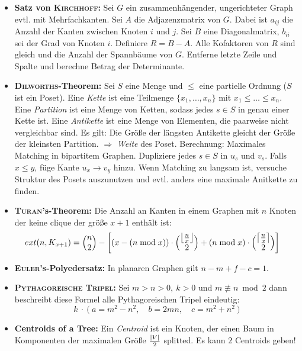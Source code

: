 \begin{itemize}
	\item \textbf{Satz von \textsc{Kirchhoff}:}
	Sei $G$ ein zusammenhängender, ungerichteter Graph evtl. mit Mehrfachkanten.
	Sei $A$ die Adjazenzmatrix von $G$.
	Dabei ist $a_{ij}$ die Anzahl der Kanten zwischen Knoten $i$ und $j$.
	Sei $B$ eine Diagonalmatrix, $b_{ii}$ sei der Grad von Knoten $i$.
	Definiere $R = B - A$.
	Alle Kofaktoren von $R$ sind gleich und die Anzahl der Spannbäume von $G$.
	\newline
	Entferne letzte Zeile und Spalte und berechne Betrag der Determinante.

	\item \textbf{\textsc{Dilworths}-Theorem:}
	Sei $S$ eine Menge und $\leq$ eine partielle Ordnung ($S$ ist ein Poset).
	Eine \emph{Kette} ist eine Teilmenge $\{x_1,\ldots,x_n\}$ mit $x_1 \leq \ldots \leq x_n$.
	Eine \emph{Partition} ist eine Menge von Ketten, sodass jedes $s \in S$ in genau einer Kette ist.
	Eine \emph{Antikette} ist eine Menge von Elementen, die paarweise nicht vergleichbar sind.
	\newline
	Es gilt: Die Größe der längsten Antikette gleicht der Größe der kleinsten Partition.
	$\Rightarrow$ \emph{Weite} des Poset.
	\newline
	Berechnung: Maximales Matching in bipartitem Graphen.
	Dupliziere jedes $s \in S$ in $u_s$ und $v_s$.
	Falls $x \leq y$, füge Kante $u_x \to v_y$ hinzu.
	Wenn Matching zu langsam ist, versuche Struktur des Posets auszunutzen und evtl. anders eine maximale Anitkette zu finden. 
	
	\item \textbf{\textsc{Turan}'s-Theorem:}
	Die Anzahl an Kanten in einem Graphen mit $n$ Knoten der keine clique der größe $x+1$ enthält ist:
	\begin{align*}
	ext(n, K_{x+1}) &= \Bigl( \begin{matrix} n \\ 2 \end{matrix} \Bigr) - \left[\left(x - (n \bmod x)\right) \cdot \Bigl( \begin{matrix} \left\lfloor\frac{n}{x}\right\rfloor \\ 2 \end{matrix} \Bigr) + \left(n\bmod x\right)  \cdot \Bigl( \begin{matrix} \left\lceil\frac{n}{x}\right\rceil \\ 2 \end{matrix} \Bigr)\right]
	\end{align*}
	
	\item \textbf{\textsc{Euler}'s-Polyedersatz:}
	In planaren Graphen gilt $n-m+f-c=1$.
	
	\item \textbf{\textsc{Pythagoreische Tripel}:}
	Sei $m>n>0,~k>0$ und $m\not\equiv n \bmod 2$ dann beschreibt diese Formel alle Pythagoreischen Tripel eindeutig:
	\[k~\cdot~\Big(~a=m^2-n^2,\quad b=2mn,\quad c=m^2+n^2~\Big)\]
	
	\item \textbf{Centroids of a Tree:}
	Ein \emph{Centroid} ist ein Knoten, der einen Baum in Komponenten der maximalen Größe $\frac{\left|V\right|}{2}$ splitted.
	Es kann $2$ Centroids geben!
	

\end{itemize}
